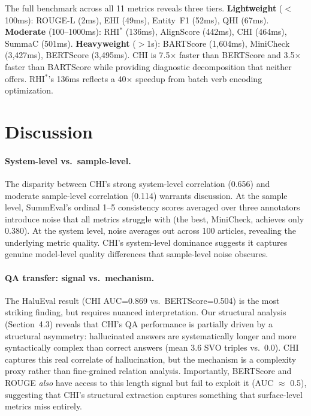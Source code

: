 \documentclass[11pt]{article}
\begin{document}
The full benchmark across all 11 metrics reveals three tiers. \textbf{Lightweight} ($<$100ms): ROUGE-L (2ms), EHI (49ms), Entity~F1 (52ms), QHI (67ms). \textbf{Moderate} (100--1000ms): RHI$^*$ (136ms), AlignScore (442ms), CHI (464ms), SummaC (501ms). \textbf{Heavyweight} ($>$1s): BARTScore (1,604ms), MiniCheck (3,427ms), BERTScore (3,495ms). CHI is 7.5$\times$ faster than BERTScore and 3.5$\times$ faster than BARTScore while providing diagnostic decomposition that neither offers. RHI$^*$'s 136ms reflects a 40$\times$ speedup from batch verb encoding optimization.


\section{Discussion}

\paragraph{System-level vs.\ sample-level.} The disparity between CHI's strong system-level correlation (0.656) and moderate sample-level correlation (0.114) warrants discussion. At the sample level, SummEval's ordinal 1--5 consistency scores averaged over three annotators introduce noise that all metrics struggle with (the best, MiniCheck, achieves only 0.380). At the system level, noise averages out across 100 articles, revealing the underlying metric quality. CHI's system-level dominance suggests it captures genuine model-level quality differences that sample-level noise obscures.

\paragraph{QA transfer: signal vs.\ mechanism.} The HaluEval result (CHI AUC=0.869 vs.\ BERTScore=0.504) is the most striking finding, but requires nuanced interpretation. Our structural analysis (Section~4.3) reveals that CHI's QA performance is partially driven by a structural asymmetry: hallucinated answers are systematically longer and more syntactically complex than correct answers (mean 3.6 SVO triples vs.\ 0.0). CHI captures this real correlate of hallucination, but the mechanism is a complexity proxy rather than fine-grained relation analysis. Importantly, BERTScore and ROUGE \emph{also} have access to this length signal but fail to exploit it (AUC $\approx$ 0.5), suggesting that CHI's structural extraction captures something that surface-level metrics miss entirely.
\end{document}
